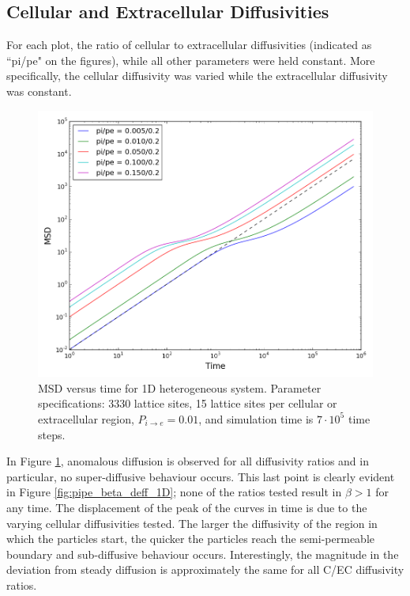 \clearpage
\subsection{Cellular and Extracellular Diffusivities}
\label{sec:1D-cellular-extracellular-diffusivities}
	For each plot, the ratio of cellular to extracellular diffusivities (indicated as ``pi/pe" on the figures), while all other parameters were held constant. More specifically, the cellular diffusivity was varied while the extracellular diffusivity was constant.
	
	\begin{figure}[h!]
		\centering
		\includegraphics[width=1.0\linewidth]{../images/1D/pipe_msd_1D}
		\caption{MSD versus time for 1D heterogeneous system. Parameter specifications: 3330 lattice sites, 15 lattice sites per cellular or extracellular region, $ P_{i \rightarrow e} = 0.01 $, and simulation time is $ 7\cdot 10^5 $ time steps. }
		\label{fig:pipe_msd_1D}
	\end{figure}
	
	In Figure \ref{fig:pipe_msd_1D}, anomalous diffusion is observed for all diffusivity ratios and in particular, no super-diffusive behaviour occurs. This last point is clearly evident in Figure \ref{fig:pipe_beta_deff_1D}; none of the ratios tested result in $ \beta > 1 $ for any time. The displacement of the peak of the curves in time is due to the varying cellular diffusivities tested. The larger the diffusivity of the region in which the particles start, the quicker the particles reach the semi-permeable boundary and sub-diffusive behaviour occurs. Interestingly, the magnitude in the deviation from steady diffusion is approximately the same for all C/EC diffusivity ratios. 
	
